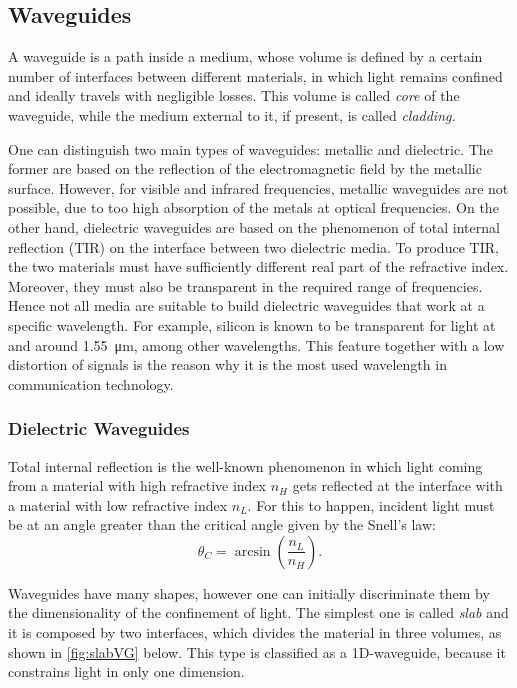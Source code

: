 \subsection{Waveguides}
\label{ssec:waveguides}
A waveguide is a path inside a medium, whose volume is defined by a certain number of interfaces between different materials, in which light remains confined and ideally travels with negligible losses.
This volume is called \textit{core} of the waveguide, while the medium external to it, if present, is called \textit{cladding.}

One can distinguish two main types of waveguides: metallic and dielectric.
The former are based on the reflection of the electromagnetic field by the metallic surface.
However, for visible and infrared frequencies, metallic waveguides are not possible, due to too high absorption of the metals at optical frequencies.
On the other hand, dielectric waveguides are based on the phenomenon of total internal reflection (TIR) on the interface between two dielectric media.
To produce TIR, the two materials must have sufficiently different real part of the refractive index.
Moreover, they must also be transparent in the required range of frequencies.
Hence not all media are suitable to build dielectric waveguides that work at a specific wavelength.
For example, silicon is known to be transparent for light at and around \SI{1.55}{\um}, among other wavelengths.
This feature together with a low distortion of signals is the reason why it is the most used wavelength in communication technology.

\subsubsection{Dielectric Waveguides}
\label{sssec:Dielectric_Waveguides}
Total internal reflection is the well-known phenomenon in which light coming from a material with high refractive index $n_H$ gets reflected at the interface with a material with low refractive index $n_L$.
For this to happen, incident light must be at an angle greater than the critical angle given by the Snell's law:
\begin{equation*}
	\theta_C = \arcsin \left( \dfrac{n_L}{n_H}\right).
\end{equation*}

Waveguides have many shapes, however one can initially discriminate them by the dimensionality of the confinement of light.
The simplest one is called \textit{slab} and it is composed by two interfaces, which divides the material in three volumes, as shown in \autoref{fig:slabVG} below.
This type is classified as a 1D-waveguide, because it constrains light in only one dimension.

